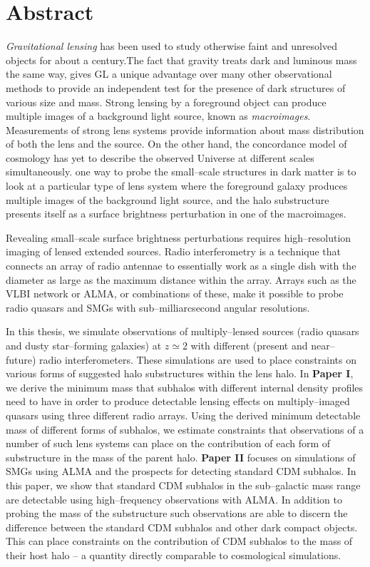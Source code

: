 \documentclass[a4wide,12pt]{book}
\newcommand{\ignore}[1]{}
\begin{document}
{\clearpage

\chapter*{Abstract}
\thispagestyle{empty}
\emph{Gravitational lensing} has been used to study otherwise faint and unresolved objects for about a century.The fact that gravity treats dark and luminous mass the same way, gives GL a unique advantage over many other observational methods to provide an independent test for the presence of dark structures of various size and mass. Strong lensing by a foreground object can produce multiple images of a background light source, known as \emph{macroimages}. Measurements of strong lens systems provide information about mass distribution of both the lens and the source. On the other hand, the concordance model of cosmology\ignore{ -- accounting for dark matter as the second abundant component in the Universe --} has yet to describe the observed Universe at different scales simultaneously. one way to probe the small--scale structures in dark matter is to look at a particular type of lens system where the foreground galaxy produces multiple images of the background light source, and the halo substructure presents itself as a surface brightness perturbation in one of the macroimages.

Revealing small--scale surface brightness perturbations requires high--resolution imaging of lensed extended sources. Radio interferometry is a technique that connects an array of radio antennae to essentially work as a single dish with the diameter as large as the maximum distance within the array. Arrays such as the VLBI network or ALMA, or combinations of these, make it possible to probe radio quasars and SMGs with sub--milliarcsecond angular resolutions.

In this thesis, we simulate observations of multiply--lensed sources (radio quasars and dusty star--forming galaxies) at $z \simeq 2$ with different (present and near--future) radio interferometers. These simulations are used to place constraints on various forms of suggested halo substructures within the lens halo. In {\bf Paper I}, we derive the minimum  mass that subhalos with different internal density profiles need to have in order to produce detectable lensing effects on multiply--imaged quasars using three different radio arrays. Using the derived minimum detectable mass of different forms of subhalos, we estimate constraints that observations of a number of such lens systems can place on the contribution of each form of substructure in the mass of the parent halo. {\bf Paper II} focuses on simulations of SMGs using ALMA and the prospects for detecting standard CDM subhalos. In this paper, we show that standard CDM subhalos in the sub--galactic mass range are detectable using high--frequency observations with ALMA. In addition to probing the mass of the substructure such observations are able to discern the difference between the standard CDM subhalos and other dark compact objects.  This can place constraints on the contribution of CDM subhalos to the mass of their host halo -- a quantity directly comparable to cosmological simulations.


}
\end{document}
